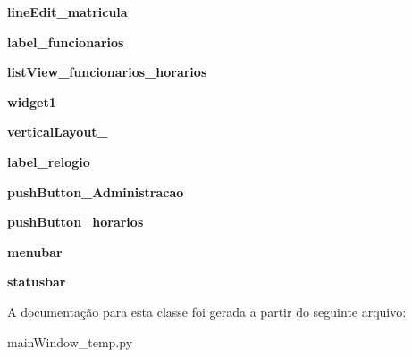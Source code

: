 \begin{DoxyCompactItemize}
\item 
\hypertarget{classmainWindow__temp_1_1Ui__ControleDeAcesso_a27f0be79b594a0aca97bd401f2319a0a}{{\bfseries line\-Edit\-\_\-matricula}}\label{classmainWindow__temp_1_1Ui__ControleDeAcesso_a27f0be79b594a0aca97bd401f2319a0a}

\item 
\hypertarget{classmainWindow__temp_1_1Ui__ControleDeAcesso_a266cedc63810d547e5f47256ce241a4a}{{\bfseries label\-\_\-funcionarios}}\label{classmainWindow__temp_1_1Ui__ControleDeAcesso_a266cedc63810d547e5f47256ce241a4a}

\item 
\hypertarget{classmainWindow__temp_1_1Ui__ControleDeAcesso_a40cf45439484aeff2da7825e25dffb0d}{{\bfseries list\-View\-\_\-funcionarios\-\_\-horarios}}\label{classmainWindow__temp_1_1Ui__ControleDeAcesso_a40cf45439484aeff2da7825e25dffb0d}

\item 
\hypertarget{classmainWindow__temp_1_1Ui__ControleDeAcesso_a0b4754fbedec7054446ad4c73596bfb6}{{\bfseries widget1}}\label{classmainWindow__temp_1_1Ui__ControleDeAcesso_a0b4754fbedec7054446ad4c73596bfb6}

\item 
\hypertarget{classmainWindow__temp_1_1Ui__ControleDeAcesso_a0e724b7f92aa9169159bc6c7bc0096cd}{{\bfseries vertical\-Layout\-\_}}\label{classmainWindow__temp_1_1Ui__ControleDeAcesso_a0e724b7f92aa9169159bc6c7bc0096cd}

\item 
\hypertarget{classmainWindow__temp_1_1Ui__ControleDeAcesso_a4b84cce1a369417f05f1b0d6b9c9c052}{{\bfseries label\-\_\-relogio}}\label{classmainWindow__temp_1_1Ui__ControleDeAcesso_a4b84cce1a369417f05f1b0d6b9c9c052}

\item 
\hypertarget{classmainWindow__temp_1_1Ui__ControleDeAcesso_aec3e3af019049a9e2676c516c71e9775}{{\bfseries push\-Button\-\_\-\-Administracao}}\label{classmainWindow__temp_1_1Ui__ControleDeAcesso_aec3e3af019049a9e2676c516c71e9775}

\item 
\hypertarget{classmainWindow__temp_1_1Ui__ControleDeAcesso_a4df2f0453687040630b89e59c71f0e99}{{\bfseries push\-Button\-\_\-horarios}}\label{classmainWindow__temp_1_1Ui__ControleDeAcesso_a4df2f0453687040630b89e59c71f0e99}

\item 
\hypertarget{classmainWindow__temp_1_1Ui__ControleDeAcesso_aa323478e142eb880c519db85efe8757e}{{\bfseries menubar}}\label{classmainWindow__temp_1_1Ui__ControleDeAcesso_aa323478e142eb880c519db85efe8757e}

\item 
\hypertarget{classmainWindow__temp_1_1Ui__ControleDeAcesso_afc20118dfa5001c1aa10b6b4755302a1}{{\bfseries statusbar}}\label{classmainWindow__temp_1_1Ui__ControleDeAcesso_afc20118dfa5001c1aa10b6b4755302a1}

\end{DoxyCompactItemize}


\-A documentação para esta classe foi gerada a partir do seguinte arquivo\-:\begin{DoxyCompactItemize}
\item 
main\-Window\-\_\-temp.\-py\end{DoxyCompactItemize}
